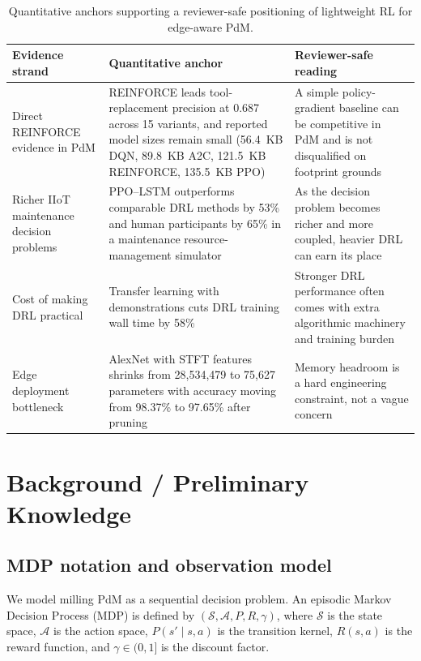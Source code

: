 \documentclass[sn-basic]{sn-jnl} %
\begin{document}
\begin{table}[t]
        \centering
        \small
        \setlength{\tabcolsep}{4pt}
        \begin{tabular}{p{} p{} p{}}
                \toprule
                Evidence strand & Quantitative anchor & Reviewer-safe reading \\
                \midrule
                Direct REINFORCE evidence in PdM & REINFORCE leads tool-replacement precision at 0.687 across 15 variants, and reported model sizes remain small (56.4~KB DQN, 89.8~KB A2C, 121.5~KB REINFORCE, 135.5~KB PPO) \cite{Siraskar2025} & A simple policy-gradient baseline can be competitive in PdM and is not disqualified on footprint grounds \\
                Richer IIoT maintenance decision problems & PPO--LSTM outperforms comparable DRL methods by 53\% and human participants by 65\% in a maintenance resource-management simulator \cite{Ong2022-01} & As the decision problem becomes richer and more coupled, heavier DRL can earn its place \\
                Cost of making DRL practical & Transfer learning with demonstrations cuts DRL training wall time by 58\% \cite{Ong2022-02} & Stronger DRL performance often comes with extra algorithmic machinery and training burden \\
                Edge deployment bottleneck & AlexNet with STFT features shrinks from 28,534,479 to 75,627 parameters with accuracy moving from 98.37\% to 97.65\% after pruning \cite{Pandey2023} & Memory headroom is a hard engineering constraint, not a vague concern \\
                \bottomrule
        \end{tabular}
        \caption{Quantitative anchors supporting a reviewer-safe positioning of lightweight RL for edge-aware PdM.}
        \label{tab:quantitative_anchors_lightweight_edge}
\end{table}
\section{Background / Preliminary Knowledge}
\subsection{MDP notation and observation model}
We model milling PdM as a sequential decision problem. An episodic Markov Decision Process (MDP) is defined by $(\mathcal{S},\mathcal{A},P,R,\gamma)$, where $\mathcal{S}$ is the state space, $\mathcal{A}$ is the action space, $P(s'\mid s,a)$ is the transition kernel, $R(s,a)$ is the reward function, and $\gamma\in(0,1]$ is the discount factor.
\end{document}
